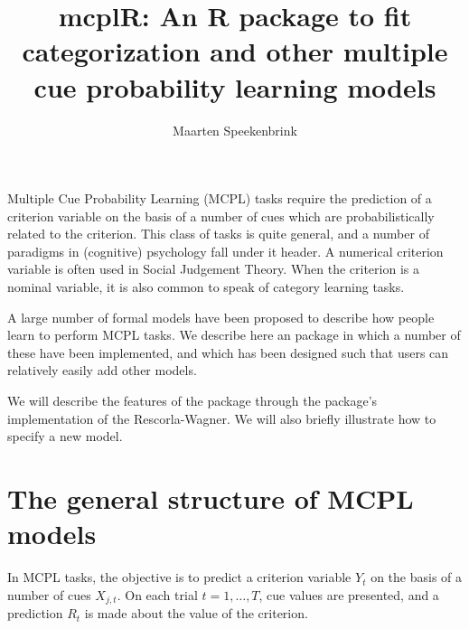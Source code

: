 \documentclass[doc]{apa}
\title{mcplR: An R package to fit categorization and other multiple cue probability learning models}
\author{Maarten Speekenbrink}
\affiliation{Department of Psychology \\ University College London}
\newcommand{\code}[1]{{\ttfamily{#1}}}
\begin{document}
\maketitle

Multiple Cue Probability Learning (MCPL) tasks require the prediction of a criterion variable on the basis of a number of cues which are probabilistically related to the criterion. This class of tasks is quite general, and a number of paradigms in (cognitive) psychology fall under it header. A numerical criterion variable is often used in Social Judgement Theory. When the criterion is a nominal variable, it is also common to speak of category learning tasks. 

A large number of formal models have been proposed to describe how people learn to perform MCPL tasks. We describe here an \code{R} package in which a number of these have been implemented, and which has been designed such that users can relatively easily add other models. 

We will describe the features of the package through the package's implementation of the Rescorla-Wagner. We will also briefly illustrate how to specify a new model. 

\section{The general structure of MCPL models}

In MCPL tasks, the objective is to predict a criterion variable $Y_t$ on the basis of a number of cues $X_{j,t}$. On each trial $t = 1,\ldots,T$, cue values are presented, and a prediction $R_t$ is made about the value of the criterion.
\end{document}
